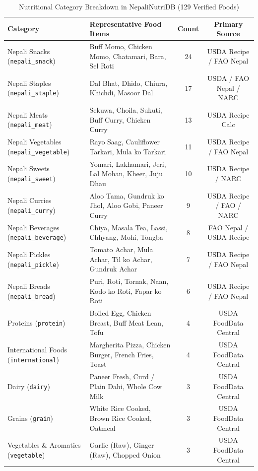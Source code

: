 \documentclass[12pt,a4paper]{report}
\begin{document}
\begin{table}[htbp]
\centering
\small
\caption{Nutritional Category Breakdown in NepaliNutriDB (129 Verified Foods)}
\label{tab:categories}
\begin{tabular}{llcc}
\toprule
\textbf{Category} & \textbf{Representative Food Items} & \textbf{Count} & \textbf{Primary Source} \\
\midrule
Nepali Snacks (\texttt{nepali\_snack}) & Buff Momo, Chicken Momo, Chatamari, Bara, Sel Roti & 24 & USDA Recipe / FAO Nepal \\
Nepali Staples (\texttt{nepali\_staple}) & Dal Bhat, Dhido, Chiura, Khichdi, Masoor Dal & 17 & USDA / FAO Nepal / NARC \\
Nepali Meats (\texttt{nepali\_meat}) & Sekuwa, Choila, Sukuti, Buff Curry, Chicken Curry & 13 & USDA Recipe Calc \\
Nepali Vegetables (\texttt{nepali\_vegetable}) & Rayo Saag, Cauliflower Tarkari, Mula ko Tarkari & 11 & USDA Recipe / FAO Nepal \\
Nepali Sweets (\texttt{nepali\_sweet}) & Yomari, Lakhamari, Jeri, Lal Mohan, Kheer, Juju Dhau & 10 & USDA Recipe / NARC \\
Nepali Curries (\texttt{nepali\_curry}) & Aloo Tama, Gundruk ko Jhol, Aloo Gobi, Paneer Curry & 9 & USDA Recipe / FAO / NARC \\
Nepali Beverages (\texttt{nepali\_beverage}) & Chiya, Masala Tea, Lassi, Chhyang, Mohi, Tongba & 8 & FAO Nepal / USDA Recipe \\
Nepali Pickles (\texttt{nepali\_pickle}) & Tomato Achar, Mula Achar, Til ko Achar, Gundruk Achar & 7 & USDA Recipe / FAO Nepal \\
Nepali Breads (\texttt{nepali\_bread}) & Puri, Roti, Tornak, Naan, Kodo ko Roti, Fapar ko Roti & 6 & USDA Recipe / FAO Nepal \\
Proteins (\texttt{protein}) & Boiled Egg, Chicken Breast, Buff Meat Lean, Tofu & 4 & USDA FoodData Central \\
International Foods (\texttt{international}) & Margherita Pizza, Chicken Burger, French Fries, Toast & 4 & USDA FoodData Central \\
Dairy (\texttt{dairy}) & Paneer Fresh, Curd / Plain Dahi, Whole Cow Milk & 3 & USDA FoodData Central \\
Grains (\texttt{grain}) & White Rice Cooked, Brown Rice Cooked, Oatmeal & 3 & USDA FoodData Central \\
Vegetables \& Aromatics (\texttt{vegetable}) & Garlic (Raw), Ginger (Raw), Chopped Onion & 3 & USDA FoodData Central \\

\end{tabular}
\end{table}
\end{document}
